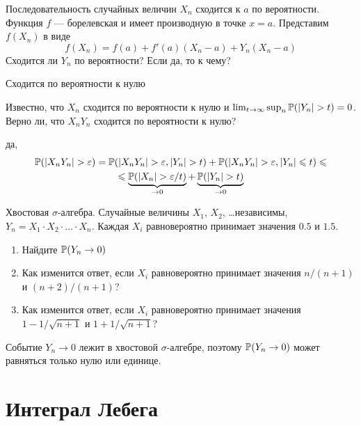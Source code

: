 \begin{problem}
Последовательность случайных величин $X_n$ сходится к $a$ по вероятности. Функция $f$ --- борелевская и имеет производную в точке $x=a$. Представим $f(X_n)$ в виде
\begin{equation}
f(X_n)=f(a)+f'(a)(X_n-a)+Y_n(X_n-a)
\end{equation}
Сходится ли $Y_n$ по вероятности? Если да, то к чему?
\end{problem} 
\begin{solution} 
Сходится по вероятности к нулю
\end{solution}

\begin{problem}
Известно, что $X_n$ сходится по вероятности к нулю и $\lim_{t\to\infty} \sup_n \P(|Y_n|>t)=0$. Верно ли, что $X_n Y_n$ сходится по вероятности к нулю?
\end{problem} 
\begin{solution} 
да,
\begin{multline}
\P(|X_nY_n|>\varepsilon)=\P(|X_nY_n|>\varepsilon, |Y_n|>t)+\P(|X_nY_n|>\varepsilon, |Y_n|\leq t)\leq \\
\leq \underbrace{\P(|X_n|>\varepsilon/t)}_{\to 0}+\underbrace{\P(|Y_n|>t)}_{\to 0}
\end{multline}
\end{solution}

\begin{problem}
Хвостовая $\sigma$-алгебра. Случайные величины $X_1$, $X_2$, \ldots независимы, $Y_n=X_1\cdot X_2\cdot\ldots\cdot X_n$. Каждая $X_i$ равновероятно принимает значения $0.5$ и $1.5$. 
\begin{enumerate}
\item Найдите $\P(Y_n \to 0)$
\item Как изменится ответ, если $X_i$ равновероятно принимает значения $n/(n+1)$ и $(n+2)/(n+1)$?
\item Как изменится ответ, если $X_i$ равновероятно принимает значения $1-1/\sqrt{n+1}$ и $1+1/\sqrt{n+1}$?
\end{enumerate}
\end{problem} 
\begin{solution} 
Событие $Y_n\to 0$ лежит в хвостовой $\sigma$-алгебре, поэтому $\P(Y_n\to 0)$ может равняться только нулю или единице.
\end{solution}

\section{Интеграл Лебега} 

